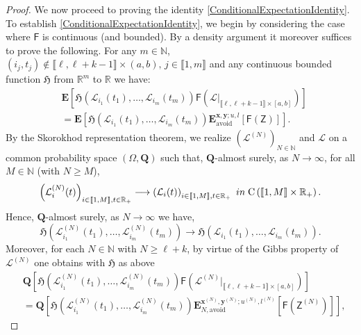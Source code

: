 \documentclass[10pt,a4paper]{amsart}
\begin{document}
\begin{proof}
We now proceed to proving the identity
\eqref{ConditionalExpectationIdentity}.  To establish \eqref{ConditionalExpectationIdentity}, we begin by considering the case where $\mathsf{F}$ is continuous (and bounded). By a density argument it moreover suffices to  prove the following. For any $m \in \mathbb{N}$,  $(i_j,t_j) \notin \llbracket \ell, \ell+k-1 \rrbracket \times (a,b),\,j\in\llbracket 1,m\rrbracket$ and any continuous bounded function $\mathfrak{H}$ from $\mathbb{R}^m$ to $\mathbb{R}$ we have:
\begin{align}\label{ConditionalExpectWithFunction}
&\mathbf{E}\left[\mathfrak{H}\left (\mathcal{L}_{i_1}(t_1), \ldots, \mathcal{L}_{i_m}(t_m)\right)\mathsf{F}\left(\mathcal{L}|_{\llbracket \ell, \ell+k-1 \rrbracket \times [a,b]}\right)\right]\nonumber \\&= \mathbf{E}\left[\mathfrak{H}\left (\mathcal{L}_{i_1}(t_1), \ldots, \mathcal{L}_{i_m}(t_m)\right)\mathbf{E}_{\mathrm{avoid}}^{\mathbf{x},\mathbf{y};u,l}\left[\mathsf{F}(\mathsf{Z})\right]\right].
\end{align}
By the Skorokhod representation theorem, we realize $(\mathcal{L}^{(N)})_{N\in \mathbb{N}}$ and $\mathcal{L}$ on a common probability space $(\Omega,\mathbf{Q})$ such that, $\mathbf{Q}$-almost surely, as $N \longrightarrow \infty$, for all $M \in \mathbb{N}$ (with $N \ge M$),
\begin{align}\label{a.s.conv} \left(\mathcal{L}^{(N)}_{i}(t)\right)_{i\in \llbracket 1, M \rrbracket, t\in \mathbb{R}_+}\longrightarrow\left(\mathcal{L}_{i}(t)\right)_{i\in \llbracket 1, M \rrbracket, t\in \mathbb{R}_+} \ \textnormal{ in }\; \mathrm{C}\left(\llbracket 1, M \rrbracket \times\mathbb{R}_+\right).
\end{align}
Hence, $\mathbf{Q}$-almost surely, as $N \longrightarrow \infty$ we have,
\begin{equation}\label{ExtFnConv}
\mathfrak{H}\left (\mathcal{L}^{(N)}_{i_1}(t_1), \ldots, \mathcal{L}^{(N)}_{i_m}(t_m)\right) \longrightarrow \mathfrak{H}\left (\mathcal{L}_{i_1}(t_1), \ldots, \mathcal{L}_{i_m}(t_m)\right).
\end{equation}
Moreover, for each \(N\in\mathbb{N}\)
with $N\ge  \ell+k$, by virtue of the Gibbs property of $\mathcal{L}^{(N)}$ one obtains with $\mathfrak{H}$ as above
\begin{align}
&\mathbf{Q}\left[\mathfrak{H}\left (\mathcal{L}^{(N)}_{i_1}(t_1), \ldots, \mathcal{L}^{(N)}_{i_m}(t_m)\right)\mathsf{F}\left(\mathcal{L}^{(N)}|_{\llbracket \ell, \ell+k-1 \rrbracket \times [a,b]}\right)\right]\nonumber
\\&= \mathbf{Q}\left[\mathfrak{H}\left (\mathcal{L}^{(N)}_{i_1}(t_1), \ldots, \mathcal{L}^{(N)}_{i_m}(t_m)\right) \mathbf{E}_{N,\mathrm{avoid}}^{\mathbf{x}^{(N)},\mathbf{y}^{(N)};u^{(N)},l^{(N)}}\left[\mathsf{F}\left(\mathsf{Z}^{(N)}\right)\right]\right]\label{BGP_N},

\end{align}
\end{proof}
\end{document}
